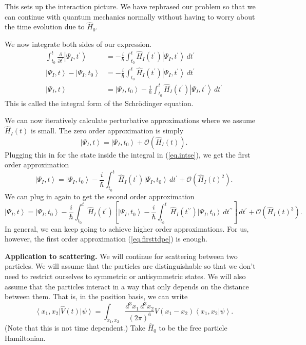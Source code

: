 \documentclass[11pt]{article}
\newcommand{\Od}[1]{\mathcal{O}{\left(#1\right)}}
\newcommand{\bra}[1]{\left\langle#1\right|}
\newcommand{\ket}[1]{\left|#1\right\rangle}
\newcommand{\braket}[2]{\left\langle#1|#2\right\rangle}
\newcommand{\op}[1]{\hat{#1}}
\theoremstyle{theorem}
\theoremstyle{remark}
\theoremstyle{step}
\theoremstyle{gap}
\begin{document}
This sets up the interaction picture. We have rephrased our problem so that we can continue with quantum mechanics normally without having to worry about the time evolution due to \(\op{H}_0\).

We now integrate both sides of our expression.
\begin{align}
\int_{t_0}^t \frac{\partial}{\partial t^\prime} \ket{\Psi_I, t^\prime} &= -\frac{i}{\hbar} \int_{t_0}^t \op{H}_I(t^\prime)\ket{\Psi_I, t^\prime} \,dt^\prime \nonumber\\
\ket{\Psi_I, t} - \ket{\Psi_I, t_0} &= -\frac{i}{\hbar} \int_{t_0}^t \op{H}_I(t^\prime)\ket{\Psi_I, t^\prime} \,dt^\prime \nonumber\\
\ket{\Psi_I, t} &= \ket{\Psi_I, t_0} - \frac{i}{\hbar} \int_{t_0}^t \op{H}_I(t^\prime)\ket{\Psi_I, t^\prime} \,dt^\prime \label{eq.intse}
\end{align}
This is called the integral form of the Schr\"odinger equation.

We can now iteratively calculate perturbative approximations where we assume \(\op{H}_I(t)\) is small. The zero order approximation is simply
\[\ket{\Psi_I, t} = \ket{\Psi_I, t_0} + \Od{\op{H}_I(t)}.\]
Plugging this in for the state inside the integral in (\ref{eq.intse}), we get the first order approximation
\begin{equation}\label{eq.firsttdpe}
\ket{\Psi_I, t} = \ket{\Psi_I, t_0} - \frac{i}{\hbar} \int_{t_0}^t \op{H}_I(t^\prime)\ket{\Psi_I, t_0} \,dt^\prime + \Od{\op{H}_I(t)^2}.
\end{equation}
We can plug in again to get the second order approximation
\[
\ket{\Psi_I, t} = \ket{\Psi_I, t_0} - \frac{i}{\hbar} \int_{t_0}^t \op{H}_I(t^\prime)\left[\ket{\Psi_I, t_0} - \frac{i}{\hbar} \int_{t_0}^t \op{H}_I(t^{\prime\prime})\ket{\Psi_I, t_0} \,dt^{\prime\prime}\right] \,dt^\prime + \Od{\op{H}_I(t)^3}.
\]
In general, we can keep going to achieve higher order approximations. For us, however, the first order approximation (\ref{eq.firsttdpe}) is enough.

{\bf Application to scattering.} We will continue for scattering between two particles. We will assume that the particles are distinguishable so that we don't need to restrict ourselves to symmetric or antisymmetric states. We will also assume that the particles interact in a way that only depends on the distance between them. That is, in the position basis, we can write \[\bra{x_1, x_2}\op{V}(t)\ket{\psi} = \int_{x_1,x_2} \frac{d^3 x_1 \,d^3x_2}{(2\pi)^6} V(x_1 - x_2) \braket{x_1, x_2}{\psi}.\] (Note that this is not time dependent.) Take \(\op{H}_0\) to be the free particle Hamiltonian.
\end{document}
